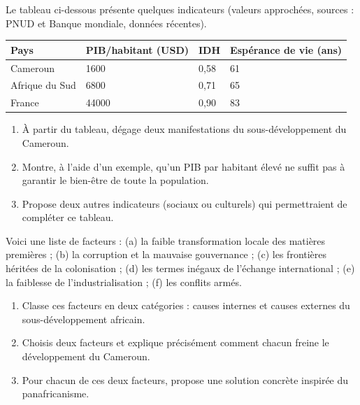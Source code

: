 \documentclass[11pt]{article}
\begin{document}
\begin{exercice}
Le tableau ci-dessous présente quelques indicateurs (valeurs approchées, sources : PNUD et Banque mondiale, données récentes).

\begin{center}
\begin{tabularx}{\linewidth}{|l|X|X|X|}
\hline
\rowcolor{popblueL} \textbf{Pays} & \textbf{PIB/habitant (USD)} & \textbf{IDH} & \textbf{Espérance de vie (ans)} \\
\hline
Cameroun & \num{1600} & 0,58 & 61 \\
\hline
Afrique du Sud & \num{6800} & 0,71 & 65 \\
\hline
France & \num{44000} & 0,90 & 83 \\
\hline
\end{tabularx}
\end{center}

\begin{enumerate}
\item À partir du tableau, dégage deux manifestations du sous-développement du Cameroun.
\item Montre, à l'aide d'un exemple, qu'un PIB par habitant élevé ne suffit pas à garantir le bien-être de toute la population.
\item Propose deux autres indicateurs (sociaux ou culturels) qui permettraient de compléter ce tableau.
\end{enumerate}
\end{exercice}

\begin{exercice}
Voici une liste de facteurs : (a) la faible transformation locale des matières premières ; (b) la corruption et la mauvaise gouvernance ; (c) les frontières héritées de la colonisation ; (d) les termes inégaux de l'échange international ; (e) la faiblesse de l'industrialisation ; (f) les conflits armés.
\begin{enumerate}
\item Classe ces facteurs en deux catégories : causes internes et causes externes du sous-développement africain.
\item Choisis deux facteurs et explique précisément comment chacun freine le développement du Cameroun.
\item Pour chacun de ces deux facteurs, propose une solution concrète inspirée du panafricanisme.
\end{enumerate}
\end{exercice}
\end{document}
